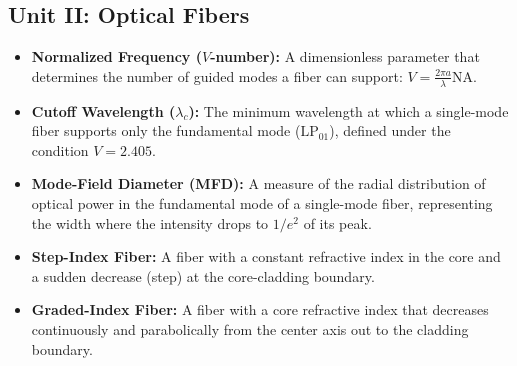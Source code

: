 \subsection{Unit II: Optical Fibers}
\begin{itemize}
  \item   \textbf{Normalized Frequency ($V$-number):} A dimensionless parameter that determines the number of guided modes a fiber can support: $V = \frac{2\pi a}{\lambda} \text{NA}$.
  \item   \textbf{Cutoff Wavelength ($\lambda_c$):} The minimum wavelength at which a single-mode fiber supports only the fundamental mode ($\text{LP}_{01}$), defined under the condition $V = 2.405$.
  \item   \textbf{Mode-Field Diameter (MFD):} A measure of the radial distribution of optical power in the fundamental mode of a single-mode fiber, representing the width where the intensity drops to $1/e^2$ of its peak.
  \item   \textbf{Step-Index Fiber:} A fiber with a constant refractive index in the core and a sudden decrease (step) at the core-cladding boundary.
  \item   \textbf{Graded-Index Fiber:} A fiber with a core refractive index that decreases continuously and parabolically from the center axis out to the cladding boundary.
\end{itemize}

